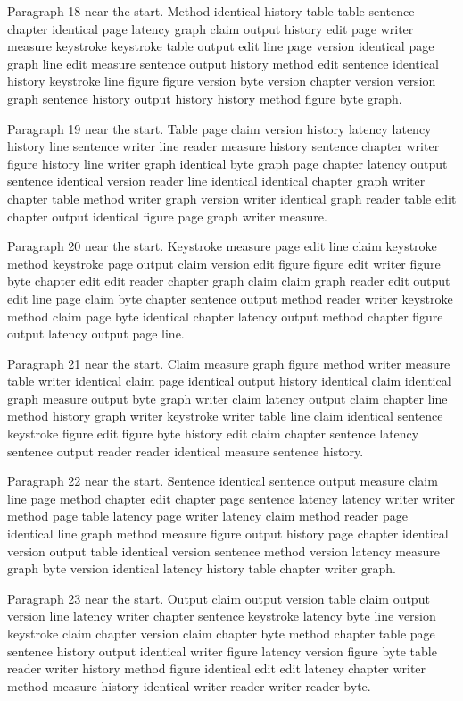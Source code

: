\documentclass{article}
\begin{document}
Paragraph 18 near the start. Method identical history table table sentence chapter identical page latency graph claim output history edit page writer measure keystroke keystroke table output edit line page version identical page graph line edit measure sentence output history method edit sentence identical history keystroke line figure figure version byte version chapter version version graph sentence history output history history method figure byte graph.

Paragraph 19 near the start. Table page claim version history latency latency history line sentence writer line reader measure history sentence chapter writer figure history line writer graph identical byte graph page chapter latency output sentence identical version reader line identical identical chapter graph writer chapter table method writer graph version writer identical graph reader table edit chapter output identical figure page graph writer measure.

Paragraph 20 near the start. Keystroke measure page edit line claim keystroke method keystroke page output claim version edit figure figure edit writer figure byte chapter edit edit reader chapter graph claim claim graph reader edit output edit line page claim byte chapter sentence output method reader writer keystroke method claim page byte identical chapter latency output method chapter figure output latency output page line.

Paragraph 21 near the start. Claim measure graph figure method writer measure table writer identical claim page identical output history identical claim identical graph measure output byte graph writer claim latency output claim chapter line method history graph writer keystroke writer table line claim identical sentence keystroke figure edit figure byte history edit claim chapter sentence latency sentence output reader reader identical measure sentence history.

Paragraph 22 near the start. Sentence identical sentence output measure claim line page method chapter edit chapter page sentence latency latency writer writer method page table latency page writer latency claim method reader page identical line graph method measure figure output history page chapter identical version output table identical version sentence method version latency measure graph byte version identical latency history table chapter writer graph.

Paragraph 23 near the start. Output claim output version table claim output version line latency writer chapter sentence keystroke latency byte line version keystroke claim chapter version claim chapter byte method chapter table page sentence history output identical writer figure latency version figure byte table reader writer history method figure identical edit edit latency chapter writer method measure history identical writer reader writer reader byte.
\end{document}
